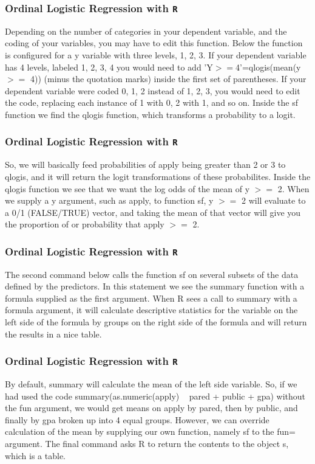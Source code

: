 \documentclass[00-GLMregslides.tex]{subfiles}
\begin{document}
\begin{frame}[fragile]
	
	\frametitle{Ordinal Logistic Regression with \texttt{R}}
	\Large
	
	Depending on the number of categories in your dependent variable, and the coding of your variables, you may have to edit this function. Below the function is configured for a y variable with three levels, 1, 2, 3. If your dependent variable has 4 levels, labeled 1, 2, 3, 4 you would need to add 'Y$>=$4'=qlogis(mean(y $>=$ 4)) (minus the quotation marks) inside the first set of parentheses. If your dependent variable were coded 0, 1, 2 instead of 1, 2, 3, you would need to edit the code, replacing each instance of 1 with 0, 2 with 1, and so on. Inside the sf function we find the qlogis function, which transforms a probability to a logit. 
	
\end{frame}
\begin{frame}[fragile]
	
	\frametitle{Ordinal Logistic Regression with \texttt{R}}
	\Large
	So, we will basically feed probabilities of apply being greater than 2 or 3 to qlogis, and it will return the logit transformations of these probabilites. Inside the qlogis function we see that we want the log odds of the mean of y $>=$ 2. When we supply a y argument, such as apply, to function sf, y $>=$ 2 will evaluate to a 0/1 (FALSE/TRUE) vector, and taking the mean of that vector will give you the proportion of or probability that apply $>=$ 2.
\end{frame}
\begin{frame}[fragile]
	
	\frametitle{Ordinal Logistic Regression with \texttt{R}}
	\Large
	The second command below calls the function sf on several subsets of the data defined by the predictors. In this statement we see the summary function with a formula supplied as the first argument. When R sees a call to summary with a formula argument, it will calculate descriptive statistics for the variable on the left side of the formula by groups on the right side of the formula and will return the results in a nice table. 
\end{frame}
\begin{frame}[fragile]
	
	\frametitle{Ordinal Logistic Regression with \texttt{R}}
	\Large
	
	By default, summary will calculate the mean of the left side variable. So, if we had used the code summary(as.numeric(apply) ~ pared + public + gpa) without the fun argument, we would get means on apply by pared, then by public, and finally by gpa broken up into 4 equal groups. However, we can override calculation of the mean by supplying our own function, namely sf to the fun= argument. The final command asks R to return the contents to the object s, which is a table.
\end{frame}
\end{document}
